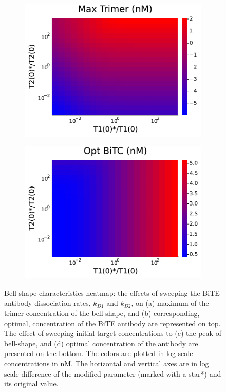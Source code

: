 \begin{figure}
\begin{subfigure}[b]{0.46\textwidth}
		\centering
		\includegraphics[width=1\textwidth]{fig/h3.pdf}
		\caption{}
		\label{fig:h3}
	\end{subfigure}
	\hspace{0.05\textwidth}
	\begin{subfigure}[b]{0.46\textwidth}
		\centering
		\includegraphics[width=1\textwidth]{fig/h4.pdf}
		\caption{}
		\label{fig:h4}
	\end{subfigure}
	\caption[Characteristics heatmap]{Bell-shape characteristics heatmap: the effects of sweeping the \ac{BiTE} antibody dissociation rates, $k_{D1}$ and $k_{D2}$, on (a) maximum of the trimer concentration of the bell-shape, and (b) corresponding, optimal, concentration of the \ac{BiTE} antibody are represented on top. The effect of sweeping initial target concentrations to (c) the peak of bell-shape, and (d) optimal concentration of the antibody are presented on the bottom. The colors are plotted in log scale concentrations in nM. The horizontal and vertical axes are in log scale difference of the modified parameter (marked with a star*) and its original value.}
	\label{fig:heat}
\end{figure}

